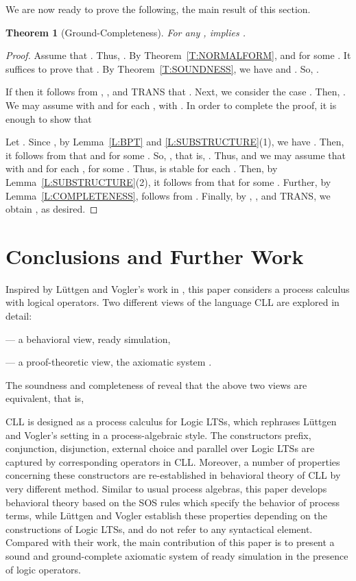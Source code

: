 \documentclass{elsarticle}
\theoremstyle{plain}
\newtheorem{theorem}{Theorem}[section]
\theoremstyle{definition}
\begin{document}
We are now ready to prove the following, the main result of this section.

\begin{theorem}[Ground-Completeness]
  For any ,  implies .
\end{theorem}
\begin{proof}
  Assume that . Thus, .
  By Theorem~\ref{T:NORMALFORM},  and  for some .
  It suffices to prove that .
  By Theorem~\ref{T:SOUNDNESS}, we have  and . So, .

   If  then it follows from , ,  and TRANS that .
   Next, we consider the case . Then, .
   We may assume  with  and for each ,  with .
    In order to complete the proof, it is enough to show that
    
    Let .
    Since , by Lemma~\ref{L:BPT} and \ref{L:SUBSTRUCTURE}(1), we have .
    Then, it follows from  that  and  for some .
    So, , that is, .
    Thus,  and we may assume that   with  and for each ,  for some .
    Thus,  is stable for each .
    Then, by Lemma~\ref{L:SUBSTRUCTURE}(2), it follows from  that  for some .
    Further, by Lemma~\ref{L:COMPLETENESS},  follows from .
    Finally, by , ,  and TRANS, we obtain , as desired.
\end{proof}

\section{Conclusions and Further Work}

Inspired by L{\"u}ttgen and Vogler's work in \cite{Luttgen10}, this paper considers a process calculus with logical operators. Two different views of the language CLL are explored in detail:

\noindent --- a behavioral view, ready simulation,

\noindent --- a proof-theoretic view, the axiomatic system .

The soundness and completeness of  reveal that the above two views are equivalent, that is,


CLL is designed as a process calculus for Logic LTSs, which rephrases L\"{u}ttgen and Vogler's setting in a process-algebraic style.
The constructors prefix, conjunction, disjunction, external choice and parallel over Logic LTSs are captured by corresponding operators in CLL.
Moreover, a number of properties concerning these constructors are re-established in behavioral theory of CLL by very different method.
Similar to usual process algebras, this paper develops behavioral theory based on the SOS rules which specify the behavior of process terms, while L{\"u}ttgen and Vogler establish these properties depending on the constructions of Logic LTSs, and do not refer to any syntactical element.
Compared with their work, the main contribution of this paper is to present a sound and ground-complete axiomatic system of ready simulation in the presence of logic operators.
\end{document}
